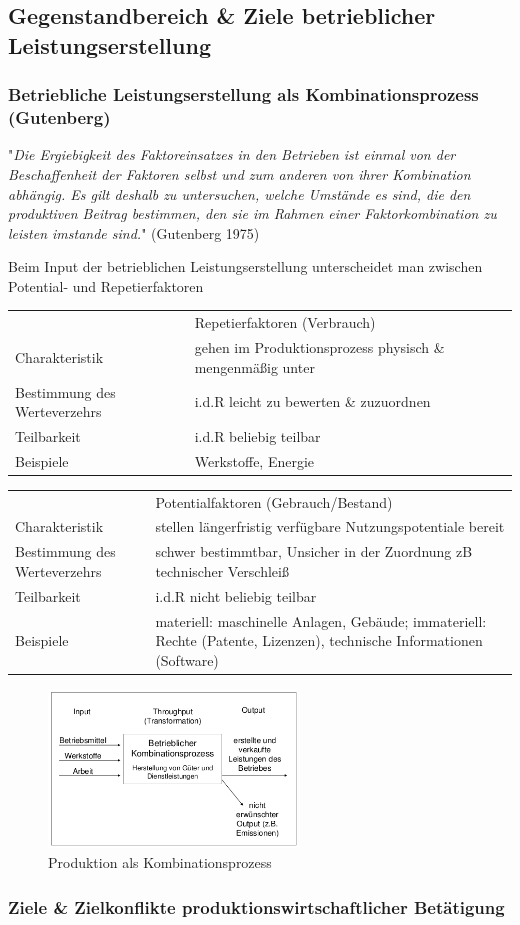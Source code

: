 \documentclass[11pt]{article}
\begin{document}
\subsection{Gegenstandbereich \& Ziele betrieblicher Leistungserstellung}
\label{sec:orgf01890d}
\subsubsection{Betriebliche Leistungserstellung als Kombinationsprozess (Gutenberg)}
\label{sec:orgd5365d1}
"\emph{Die Ergiebigkeit des Faktoreinsatzes in den  Betrieben ist einmal von der Beschaffenheit der Faktoren selbst und zum anderen von ihrer Kombination abhängig.
Es gilt deshalb zu untersuchen, welche Umstände es sind, die den produktiven Beitrag bestimmen, den sie im Rahmen einer Faktorkombination zu leisten imstande sind.}" (Gutenberg 1975)

Beim Input der betrieblichen Leistungserstellung unterscheidet man zwischen Potential- und Repetierfaktoren
\begin{center}
\begin{tabular}{ll}
 & Repetierfaktoren (Verbrauch)\\
Charakteristik & gehen im Produktionsprozess physisch \& mengenmäßig unter\\
Bestimmung des Werteverzehrs & i.d.R leicht zu bewerten \& zuzuordnen\\
Teilbarkeit & i.d.R beliebig teilbar\\
Beispiele & Werkstoffe, Energie\\
\end{tabular}
\end{center}

\begin{center}
\begin{tabular}{ll}
 & Potentialfaktoren (Gebrauch/Bestand)\\
Charakteristik & stellen längerfristig verfügbare Nutzungspotentiale bereit\\
Bestimmung des Werteverzehrs & schwer bestimmtbar, Unsicher in der Zuordnung zB technischer Verschleiß\\
Teilbarkeit & i.d.R nicht beliebig teilbar\\
Beispiele & materiell: maschinelle Anlagen, Gebäude; immateriell: Rechte (Patente, Lizenzen), technische Informationen (Software)\\
\end{tabular}
\end{center}

\begin{figure}[htbp]
\centering
\includegraphics[width=250px]{./pictures/produktion_als_kombpr.png}
\caption{Produktion als Kombinationsprozess}
\end{figure} 

\FloatBarrier

\subsubsection{Ziele \& Zielkonflikte produktionswirtschaftlicher Betätigung}
\label{sec:org49cc1ae}
\end{document}
